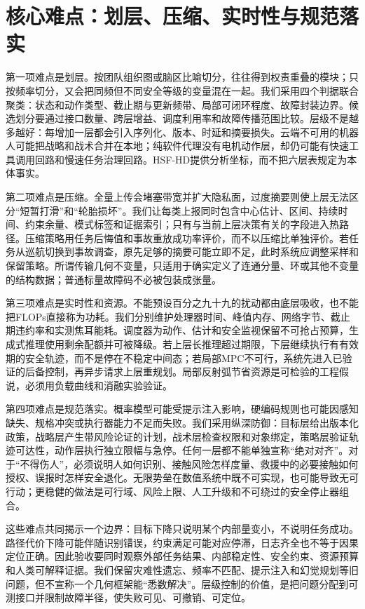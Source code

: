 \section{核心难点：划层、压缩、实时性与规范落实}
\label{sec:solving_core_difficulties}

第一项难点是划层。按团队组织图或脑区比喻切分，往往得到权责重叠的模块；只按频率切分，又会把同频但不同安全等级的变量混在一起。我们采用四个判据联合聚类：状态和动作类型、截止期与更新频带、局部可闭环程度、故障封装边界。候选划分要通过接口数量、跨层增益、调度利用率和故障传播范围比较。层级不是越多越好：每增加一层都会引入序列化、版本、时延和摘要损失。云端不可用的机器人可能把战略和战术合并在本地；纯软件代理没有电机动作层，却仍可能有快速工具调用回路和慢速任务治理回路。HSF-HD提供分析坐标，而不把六层表规定为本体事实。

第二项难点是压缩。全量上传会堵塞带宽并扩大隐私面，过度摘要则使上层无法区分“短暂打滑”和“轮胎损坏”。我们让每类上报同时包含中心估计、区间、持续时间、约束余量、模式标签和证据索引；只有与当前上层决策有关的字段进入热路径。压缩策略用任务后悔值和事故重放成功率评价，而不以压缩比单独评价。若任务从巡航切换到事故调查，原先足够的摘要可能立即不足，此时系统应调整采样和保留策略。所谓传输几何不变量，只适用于确实定义了连通分量、环或其他不变量的结构数据；普通标量故障码不必被包装成张量。

第三项难点是实时性和资源。不能预设百分之九十九的扰动都由底层吸收，也不能把FLOPs直接称为功耗。我们分别维护处理器时间、峰值内存、网络字节、截止期违约率和实测焦耳能耗。调度器为动作、估计和安全监视保留不可抢占预算，生成式推理使用剩余配额并可被降级。若上层长推理超过期限，下层继续执行有有效期的安全轨迹，而不是停在不稳定中间态；若局部MPC不可行，系统先进入已验证的后备控制，再异步请求上层重规划。局部反射弧节省资源是可检验的工程假说，必须用负载曲线和消融实验验证。

第四项难点是规范落实。概率模型可能受提示注入影响，硬编码规则也可能因感知缺失、规格冲突或执行器能力不足而失败。我们采用纵深防御：目标层给出版本化政策，战略层产生带风险论证的计划，战术层检查权限和对象绑定，策略层验证轨迹可达性，动作层执行独立限幅与急停。任何一层都不能单独宣称“绝对对齐”。对于“不得伤人”，必须说明人如何识别、接触风险怎样度量、救援中的必要接触如何授权、误报时怎样安全退化。无限势垒在数值系统中既不可实现，也可能导致无可行动；更稳健的做法是可行域、风险上限、人工升级和不可绕过的安全停止器组合。

这些难点共同揭示一个边界：目标下降只说明某个内部量变小，不说明任务成功。路径代价下降可能伴随识别错误，约束满足可能对应停滞，日志齐全也不等于因果定位正确。因此验收要同时观察外部任务结果、内部稳定性、安全约束、资源预算和人类可解释证据。我们保留灾难性遗忘、频率不匹配、提示注入和幻觉规划等旧问题，但不宣称一个几何框架能“悉数解决”。层级控制的价值，是把问题分配到可测接口并限制故障半径，使失败可见、可撤销、可定位。

